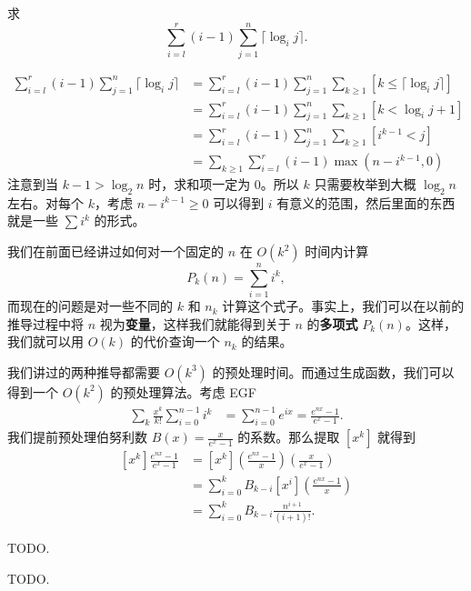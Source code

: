    \begin{example}[月下轻花舞]
        求
        $$
        \sum_{i=l}^r(i-1)\sum_{j=1}^n\lceil\log_i j\rceil.
        $$
    \end{example}
    \begin{solution}
        $$
        \begin{aligned}
        \sum_{i=l}^r(i-1)\sum_{j=1}^n\lceil\log_i j\rceil &= \sum_{i=l}^r(i-1)\sum_{j=1}^n\sum_{k\ge 1}[k\le \lceil \log_i j\rceil]\\
        &=\sum_{i=l}^r(i-1)\sum_{j=1}^n\sum_{k\ge 1}[k<\log_i j+1]\\
        &=\sum_{i=l}^r(i-1)\sum_{j=1}^n\sum_{k\ge 1}[i^{k-1}<j]\\
        &=\sum_{k\ge 1}\sum_{i=l}^r(i-1)\max(n-i^{k-1},0)
        \end{aligned}
        $$
        注意到当 $k-1>\log_2 n$ 时，求和项一定为 $0$。所以 $k$ 只需要枚举到大概 $\log_2 n$ 左右。对每个 $k$，考虑 $n-i^{k-1}\ge 0$ 可以得到 $i$ 有意义的范围，然后里面的东西就是一些 $\sum i^k$ 的形式。 

        我们在前面已经讲过如何对一个固定的 $n$ 在 $O(k^2)$ 时间内计算
        $$
        P_k(n)=\sum_{i=1}^n i^k,
        $$
        而现在的问题是对一些不同的 $k$ 和 $n_k$ 计算这个式子。事实上，我们可以在以前的推导过程中将 $n$ 视为\textbf{变量}，这样我们就能得到关于 $n$ 的\textbf{多项式} $P_k(n)$。这样，我们就可以用 $O(k)$ 的代价查询一个 $n_k$ 的结果。

        我们讲过的两种推导都需要 $O(k^3)$ 的预处理时间。而通过生成函数，我们可以得到一个 $O(k^2)$ 的预处理算法。考虑 EGF
        $$
        \begin{aligned}
        \sum_k \frac{x^k}{k!}\sum_{i=0}^{n-1}i^k&=\sum_{i=0}^{n-1} e^{ix}=\frac{e^{nx}-1}{e^x-1}.
        \end{aligned}
        $$
        我们提前预处理伯努利数 $B(x)=\frac{x}{e^x-1}$ 的系数。那么提取 $[x^k]$ 就得到
        $$
        \begin{aligned}
        [x^k]\frac{e^{nx}-1}{e^x-1}&=[x^k]\left(\frac{e^{nx}-1}{x}\right)\left(\frac{x}{e^x-1}\right)\\
        &=\sum_{i=0}^k B_{k-i}[x^i]\left(\frac{e^{nx}-1}{x}\right)\\
        &=\sum_{i=0}^k B_{k-i}\frac{n^{i+1}}{(i+1)!}.
        \end{aligned}
        $$
    \end{solution}
    \begin{example}[类欧几里得算法]
        
    \end{example}
    \begin{solution}
        TODO.
    \end{solution}
    \begin{example}[小猪佩奇学数学]
        
    \end{example}
    \begin{solution}
        TODO.
    \end{solution}

